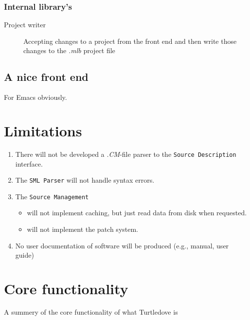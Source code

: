 \documentclass[a4paper,oneside]{memoir}
\begin{document}
\subsubsection{Internal library's}

\begin{description}

\item[Project writer] Accepting changes to a project from the front end and then
  write those changes to the \textit{.mlb} project file
\end{description}

\subsection{A nice front end}
For Emacs obviously.

\section{Limitations}

\begin{enumerate}
\item There will not be developed a \textit{.CM}-file parser to the
  \texttt{Source Description} interface.

\item The \texttt{SML Parser} will not handle syntax errors.

\item The \texttt{Source Management}

  \begin{itemize}
  \item will not implement caching, but just read data from disk when
    requested.

  \item will not implement the patch system.
  \end{itemize}

\item No user documentation of software will be produced (e.g.,
  manual, user guide)
\end{enumerate}


\section{Core functionality}

A summery of the core functionality of what Turtledove is 
\end{document}
